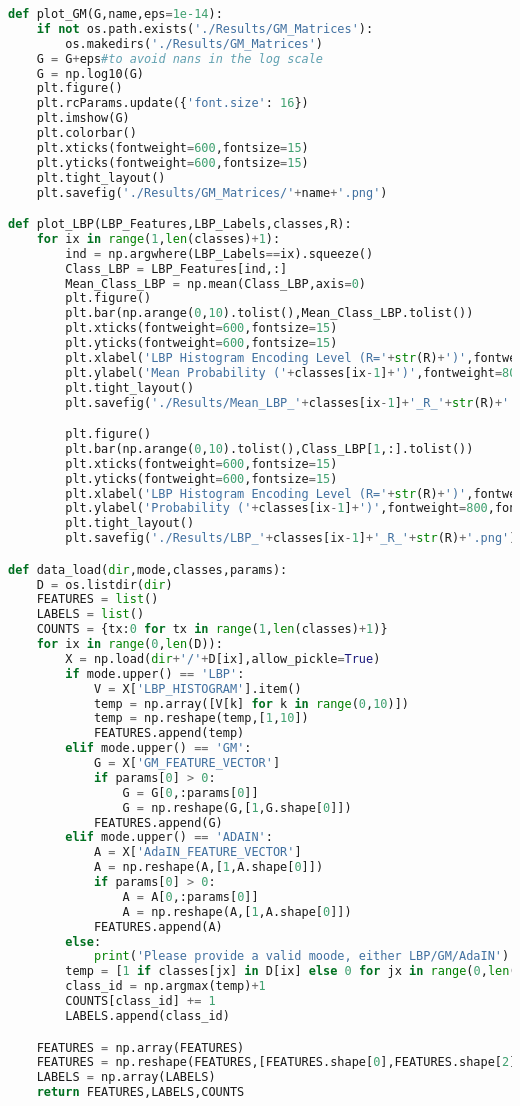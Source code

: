 \documentclass{article}
\begin{document}
\begin{lstlisting}[language=Python]
def plot_GM(G,name,eps=1e-14):
	if not os.path.exists('./Results/GM_Matrices'):
		os.makedirs('./Results/GM_Matrices')
	G = G+eps#to avoid nans in the log scale
	G = np.log10(G)
	plt.figure()
	plt.rcParams.update({'font.size': 16})
	plt.imshow(G)
	plt.colorbar()
	plt.xticks(fontweight=600,fontsize=15)
	plt.yticks(fontweight=600,fontsize=15)
	plt.tight_layout()
	plt.savefig('./Results/GM_Matrices/'+name+'.png')

def plot_LBP(LBP_Features,LBP_Labels,classes,R):
	for ix in range(1,len(classes)+1):
		ind = np.argwhere(LBP_Labels==ix).squeeze()
		Class_LBP = LBP_Features[ind,:]
		Mean_Class_LBP = np.mean(Class_LBP,axis=0)
		plt.figure()
		plt.bar(np.arange(0,10).tolist(),Mean_Class_LBP.tolist())
		plt.xticks(fontweight=600,fontsize=15)
		plt.yticks(fontweight=600,fontsize=15)
		plt.xlabel('LBP Histogram Encoding Level (R='+str(R)+')',fontweight=800,fontsize=15)
		plt.ylabel('Mean Probability ('+classes[ix-1]+')',fontweight=800,fontsize=15)
		plt.tight_layout()
		plt.savefig('./Results/Mean_LBP_'+classes[ix-1]+'_R_'+str(R)+'.png')

		plt.figure()
		plt.bar(np.arange(0,10).tolist(),Class_LBP[1,:].tolist())
		plt.xticks(fontweight=600,fontsize=15)
		plt.yticks(fontweight=600,fontsize=15)
		plt.xlabel('LBP Histogram Encoding Level (R='+str(R)+')',fontweight=800,fontsize=15)
		plt.ylabel('Probability ('+classes[ix-1]+')',fontweight=800,fontsize=15)
		plt.tight_layout()
		plt.savefig('./Results/LBP_'+classes[ix-1]+'_R_'+str(R)+'.png')

def data_load(dir,mode,classes,params):
	D = os.listdir(dir)
	FEATURES = list()
	LABELS = list()
	COUNTS = {tx:0 for tx in range(1,len(classes)+1)}
	for ix in range(0,len(D)):
		X = np.load(dir+'/'+D[ix],allow_pickle=True)
		if mode.upper() == 'LBP':
			V = X['LBP_HISTOGRAM'].item()
			temp = np.array([V[k] for k in range(0,10)])
			temp = np.reshape(temp,[1,10])
			FEATURES.append(temp)
		elif mode.upper() == 'GM':
			G = X['GM_FEATURE_VECTOR']
			if params[0] > 0:
				G = G[0,:params[0]]
				G = np.reshape(G,[1,G.shape[0]])
			FEATURES.append(G)
		elif mode.upper() == 'ADAIN':
			A = X['AdaIN_FEATURE_VECTOR']
			A = np.reshape(A,[1,A.shape[0]])
			if params[0] > 0:
				A = A[0,:params[0]]
				A = np.reshape(A,[1,A.shape[0]])
			FEATURES.append(A)
		else:
			print('Please provide a valid moode, either LBP/GM/AdaIN')
		temp = [1 if classes[jx] in D[ix] else 0 for jx in range(0,len(classes))]
		class_id = np.argmax(temp)+1
		COUNTS[class_id] += 1
		LABELS.append(class_id)

	FEATURES = np.array(FEATURES)
	FEATURES = np.reshape(FEATURES,[FEATURES.shape[0],FEATURES.shape[2]])
	LABELS = np.array(LABELS)
	return FEATURES,LABELS,COUNTS


\end{lstlisting}
\end{document}
